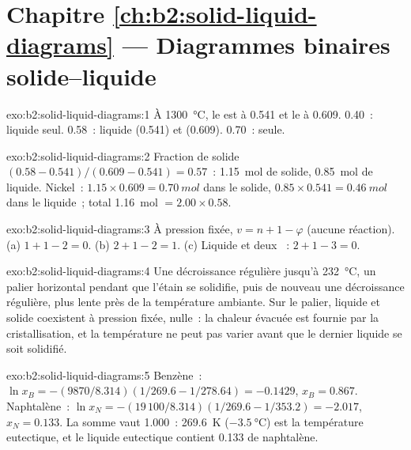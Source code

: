 \section*{Chapitre \ref{ch:b2:solid-liquid-diagrams} --- Diagrammes binaires solide--liquide}

\begin{solution}{exo:b2:solid-liquid-diagrams:1}
À \qty{1300}{\degreeCelsius}, le  est à 0.541 et le  à 0.609.
0.40~: liquide seul. 0.58~: liquide (0.541) et  (0.609). 0.70~:
 seule.
\end{solution}

\begin{solution}{exo:b2:solid-liquid-diagrams:2}
Fraction de solide $(0.58 - 0.541)/(0.609 - 0.541) = 0.57$~: \qty{1.15}{mol} de solide,
\qty{0.85}{mol} de liquide. Nickel~: $1.15 \times 0.609 = \qty{0.70}{mol}$ dans le
solide, $0.85 \times 0.541 = \qty{0.46}{mol}$ dans le liquide~; total \qty{1.16}{mol}
$= 2.00 \times 0.58$.
\end{solution}

\begin{solution}{exo:b2:solid-liquid-diagrams:3}
À pression fixée, $v = n + 1 - \varphi$ (aucune réaction). (a) $1 + 1 - 2 = 0$.
(b) $2 + 1 - 2 = 1$. (c) Liquide et deux ~: $2 + 1 - 3 = 0$.
\end{solution}

\begin{solution}{exo:b2:solid-liquid-diagrams:4}
Une décroissance régulière jusqu'à \qty{232}{\degreeCelsius}, un palier horizontal pendant que l'étain
se solidifie, puis de nouveau une décroissance régulière, plus lente près de la température ambiante. Sur le
palier, liquide et solide coexistent à pression fixée,  nulle~: la chaleur
évacuée est fournie par la cristallisation, et la température ne peut pas varier
avant que le dernier liquide se soit solidifié.
\end{solution}

\begin{solution}{exo:b2:solid-liquid-diagrams:5}
Benzène~: $\ln x_B = -(9870/8.314)(1/269.6 - 1/278.64) = -0.1429$, $x_B =
0.867$. Naphtalène~: $\ln x_N = -(19\,100/8.314)(1/269.6 - 1/353.2) = -2.017$,
$x_N = 0.133$. La somme vaut 1.000~: \qty{269.6}{K} ($\qty{-3.5}{\degreeCelsius}$) est
la température eutectique, et le liquide eutectique contient 0.133 de naphtalène.
\end{solution}

